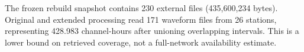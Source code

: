 The frozen rebuild snapshot contains 230 external files (435,600,234 bytes). Original and extended processing read 171 waveform files from 26 stations, representing 428.983 channel-hours after unioning overlapping intervals. This is a lower bound on retrieved coverage, not a full-network availability estimate.
